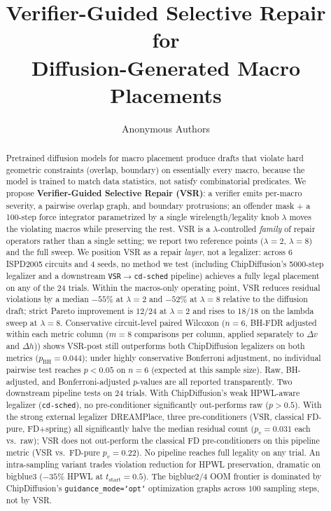 \documentclass{article}
\title{Verifier-Guided Selective Repair for\\ Diffusion-Generated Macro Placements}
\author{%
  Anonymous Authors%
}
\begin{document}
\maketitle

\begin{abstract}
Pretrained diffusion models for macro placement produce drafts that violate hard
geometric constraints (overlap, boundary) on essentially every macro, because
the model is trained to match data statistics, not satisfy combinatorial
predicates.  We propose \textbf{Verifier-Guided Selective Repair (VSR)}: a
verifier emits per-macro severity, a pairwise overlap graph, and boundary
protrusions; an offender mask + a 100-step force integrator parametrized by a
single wirelength/legality knob $\lambda$ moves the violating macros while
preserving the rest.  VSR is a $\lambda$-controlled \emph{family} of repair
operators rather than a single setting; we report two reference points
($\lambda{=}2$, $\lambda{=}8$) and the full
sweep.  We position VSR as a repair \emph{layer}, not a legalizer: across
6 ISPD2005 circuits and 4 seeds, no method we test (including
ChipDiffusion's 5000-step legalizer and a downstream
\texttt{VSR}$\to$\texttt{cd-sched} pipeline) achieves a fully legal
placement on any of the 24 trials.  Within the macros-only operating
point, VSR reduces residual violations by a median $-55\%$ at
$\lambda{=}2$ and $-52\%$ at $\lambda{=}8$ relative to the diffusion
draft; strict Pareto improvement is $12/24$ at $\lambda{=}2$ and rises
to $18/18$ on the lambda sweep at $\lambda{=}8$.  Conservative
circuit-level paired Wilcoxon ($n{=}6$, BH-FDR adjusted within each
metric column ($m{=}8$ comparisons per column, applied separately to
$\Delta v$ and $\Delta h$)) shows VSR-post still outperforms both
ChipDiffusion legalizers on both metrics ($p_\text{BH}{=}0.044$);
under highly conservative Bonferroni adjustment, no individual
pairwise test reaches $p{<}0.05$ on $n{=}6$ (expected at this sample
size).  Raw, BH-adjusted, and Bonferroni-adjusted $p$-values are all
reported transparently.  Two downstream pipeline tests on $24$ trials.  With ChipDiffusion's
weak HPWL-aware legalizer (\texttt{cd-sched}), no pre-conditioner
significantly out-performs raw ($p{>}0.5$).  With the strong external
legalizer DREAMPlace, three pre-conditioners (VSR, classical FD-pure,
FD+spring) all significantly halve the median residual count ($p_v{=}0.031$
each vs.\ raw); VSR does not out-perform the classical FD pre-conditioners
on this pipeline metric (VSR vs.\ FD-pure $p_v{=}0.22$).  No pipeline
reaches full legality on any trial.  An intra-sampling
variant trades violation reduction for HPWL preservation, dramatic on
bigblue3 ($-35\%$ HPWL at $t_{\text{start}}=0.5$).  The bigblue2/4 OOM
frontier is dominated by ChipDiffusion's \texttt{guidance\_mode='opt'}
optimization graphs across $100$ sampling steps, not by VSR.
\end{abstract}
\end{document}
